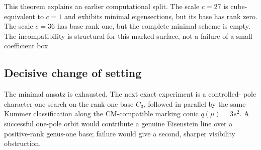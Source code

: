 This theorem explains an earlier computational split. The scale $c=27$ is
cube-equivalent to $c=1$ and exhibits minimal eigensections, but its base has
rank zero. The scale $c=36$ has base rank one, but the complete minimal
scheme is empty. The incompatibility is structural for this marked surface,
not a failure of a small coefficient box.

\subsection{Decisive change of setting}

The minimal ansatz is exhausted. The next exact experiment is a controlled-
pole character-one search on the rank-one base $C_3$, followed in parallel by
the same Kummer classification along the CM-compatible marking conic
$q(\mu)=3s^2$. A successful one-pole orbit would contribute a genuine
Eisenstein line over a positive-rank genus-one base; failure would give a
second, sharper visibility obstruction.
